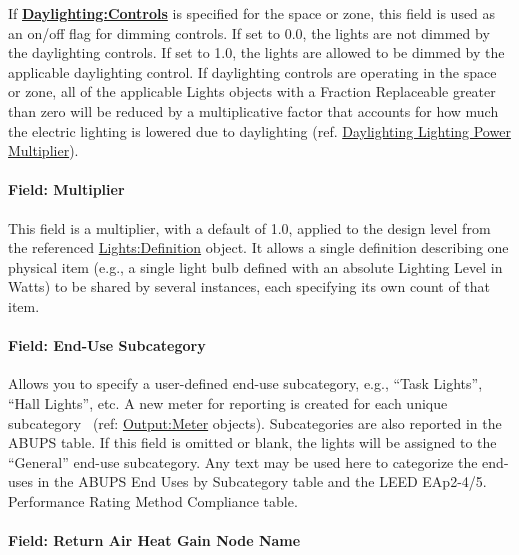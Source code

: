 If \textbf{\hyperref[daylightingcontrols-000]{Daylighting:Controls}} is specified for the space or zone, this field is used as an on/off flag for dimming controls. If set to 0.0, the lights are not dimmed by the daylighting controls. If set to 1.0, the lights are allowed to be dimmed by the applicable daylighting control. If daylighting controls are operating in the space or zone, all of the applicable Lights objects with a Fraction Replaceable greater than zero will be reduced by a multiplicative factor that accounts for how much the electric lighting is lowered due to daylighting (ref. \hyperref[daylighting-lighting-power-multiplier-1]{Daylighting Lighting Power Multiplier}).

\paragraph{Field: Multiplier}\label{field-multiplier-lightsinstance}

This field is a multiplier, with a default of 1.0, applied to the design level from the referenced \hyperref[lightsdefinition]{Lights:Definition} object. It allows a single definition describing one physical item (e.g., a single light bulb defined with an absolute Lighting Level in Watts) to be shared by several instances, each specifying its own count of that item.

\paragraph{Field: End-Use Subcategory}\label{field-end-use-subcategory-002-lights-instance}

Allows you to specify a user-defined end-use subcategory, e.g., ``Task Lights'', ``Hall Lights'', etc. A new meter for reporting is created for each unique subcategory~ (ref: \hyperref[outputmeter-and-outputmetermeterfileonly]{Output:Meter} objects). Subcategories are also reported in the ABUPS table. If this field is omitted or blank, the lights will be assigned to the ``General'' end-use subcategory. Any text may be used here to categorize the end-uses in the ABUPS End Uses by Subcategory table and the LEED EAp2-4/5. Performance Rating Method Compliance table.

\paragraph{Field: Return Air Heat Gain Node Name}\label{field-return-air-heat-gain-node-name-lights-instance}

